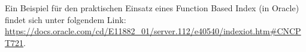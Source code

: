 \begin{enumerate}[a)]
\begin{note}
Ein Beispiel für den praktischen Einsatz eines Function Based Index (in Oracle) findet sich unter folgendem Link:\\
\href{https://docs.oracle.com/cd/E11882\_01/server.112/e40540/indexiot.htm\#CNCPT721}{https://docs.oracle.com/cd/E11882\_01/server.112/e40540/indexiot.htm\#CNCPT721}.
\end{note}

\end{enumerate}
